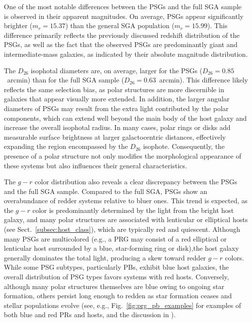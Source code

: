 \documentclass{aa}
\begin{document}
One of the most notable differences between the PSGs and the full SGA sample is observed in their apparent magnitudes. On average, PSGs appear significantly brighter ($m_r = 15.37$) than the general SGA population ($m_r = 15.99$). This difference primarily reflects the previously discussed redshift distribution of the PSGs, as well as the fact that the observed PSGs are predominantly giant and intermediate-mass galaxies, as indicated by their absolute magnitude distribution.

The $D_{26}$ isophotal diameters are, on average, larger for the PSGs ($D_{26} = 0.85$~arcmin) than for the full SGA sample ($D_{26} = 0.63$~arcmin). This difference likely reflects the same selection bias, as polar structures are more discernible in galaxies that appear visually more extended. In addition, the larger angular diameters of PSGs may result from the extra light contributed by the polar components, which can extend well beyond the main body of the host galaxy \citep{2019MNRAS.483.1470R} and increase the overall isophotal radius. In many cases, polar rings or disks add measurable surface brightness at larger galactocentric distances, effectively expanding the region encompassed by the $D_{26}$ isophote. Consequently, the presence of a polar structure not only modifies the morphological appearance of these systems but also influences their general characteristics.

The $g-r$ color distribution also reveals a clear discrepancy between the PSGs and the full SGA sample. Compared to the full SGA, PSGs show an overabundance of redder systems relative to bluer ones. This trend is expected, as the $g-r$ color is predominantly determined by the light from the bright host galaxy, and many polar structures are associated with lenticular or elliptical hosts (see Sect.~\ref{subsec:host_class}), which are typically red and quiescent. Although many PSGs are multicolored (e.g., a PRG may consist of a red elliptical or lenticular host surrounded by a blue, star-forming ring or disk),the host galaxy generally dominates the total light, producing a skew toward redder $g-r$ colors. While some PSG subtypes, particularly PBs, exhibit blue host galaxies, the overall distribution of PSG types favors systems with red hosts. Conversely, although many polar structures themselves are blue owing to ongoing star formation, others persist long enough to redden as star formation ceases and stellar populations evolve (see, e.g., Fig.~\ref{fig:prg_pb_examples} for examples of both blue and red PRs and hosts, and the discussion in \citealt{2025PASA...42...56A}).
\end{document}
